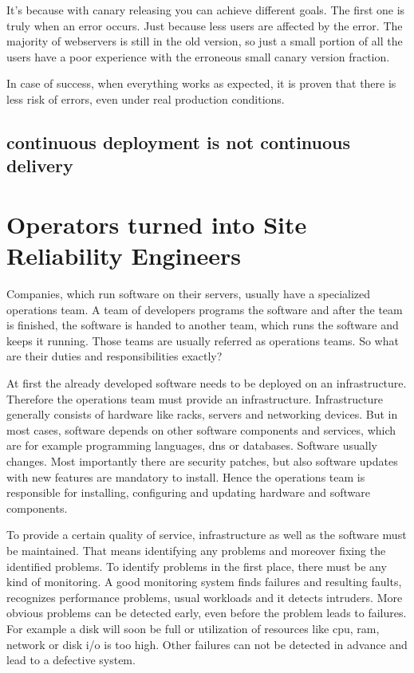 It's because with canary releasing you can achieve different goals. The first one is
truly when an error occurs. Just because less users are affected by the error. The
majority of webservers is still in the old version, so just a small portion of all the
users have a poor experience with the erroneous small canary version fraction.

In case of success, when everything works as expected, it is proven that there is less
risk of errors, even under real production conditions.


\subsection{continuous deployment is not continuous delivery}

\section{Operators turned into Site Reliability Engineers}

Companies, which run software on their servers, usually have a specialized operations
team. A team of developers programs the software and after the team is finished, the
software is handed to another team, which runs the software and keeps it running. Those
teams are usually referred as operations teams. So what are their duties and
responsibilities exactly?

At first the already developed software needs to be deployed on an
infrastructure. Therefore the operations team must provide an
infrastructure. Infrastructure generally consists of hardware like racks, servers and
networking devices. But in most cases, software depends on other software components and
services, which are for example programming languages, dns or databases. Software
usually changes. Most importantly there are security patches, but also software updates
with new features are mandatory to install. Hence the operations team is responsible for
installing, configuring and updating hardware and software components.

To provide a certain quality of service, infrastructure as well as the software must be
maintained. That means identifying any problems and moreover fixing the identified
problems. To identify problems in the first place, there must be any kind of monitoring. A
good monitoring system\cite{devops_monitoring} finds failures and resulting faults,
recognizes performance problems, usual workloads and it detects intruders. More obvious
problems can be detected early, even before the problem leads to failures. For example a
disk will soon be full or utilization of resources like cpu, ram, network or disk i/o is
too high. Other failures can not be detected in advance and lead to a defective system.

